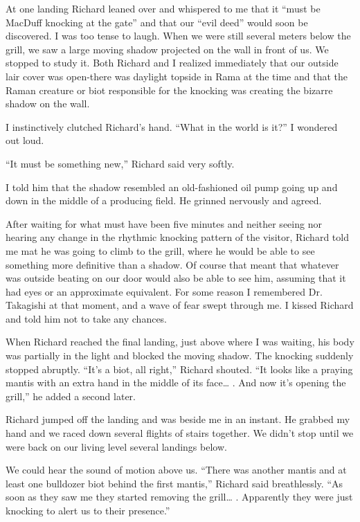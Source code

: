 \documentclass[]{article}
\begin{document}
At one landing Richard leaned over and whispered to me that it “must be MacDuff knocking at the gate” and that our “evil deed” would soon be discovered. I was too tense to laugh. When we were still several meters below the grill, we saw a large moving shadow projected on the wall in front of us. We stopped to study it. Both Richard and I realized immediately that our outside lair cover was open-there was daylight topside in Rama at the time and that the Raman creature or biot responsible for the knocking was creating the bizarre shadow on the wall.

I instinctively clutched Richard’s hand. “What in the world is it?” I wondered out loud.

“It must be something new,” Richard said very softly.

I told him that the shadow resembled an old-fashioned oil pump going up and down in the middle of a producing field. He grinned nervously and agreed.

After waiting for what must have been five minutes and neither seeing nor hearing any change in the rhythmic knocking pattern of the visitor, Richard told me mat he was going to climb to the grill, where he would be able to see something more definitive than a shadow. Of course that meant that whatever was outside beating on our door would also be able to see him, assuming that it had eyes or an approximate equivalent. For some reason I remembered Dr. Takagishi at that moment, and a wave of fear swept through me. I kissed Richard and told him not to take any chances.

When Richard reached the final landing, just above where I was waiting, his body was partially in the light and blocked the moving shadow. The knocking suddenly stopped abruptly. “It’s a biot, all right,” Richard shouted. “It looks like a praying mantis with an extra hand in the middle of its face… . And now it’s opening the grill,” he added a second later.

Richard jumped off the landing and was beside me in an instant. He grabbed my hand and we raced down several flights of stairs together. We didn’t stop until we were back on our living level several landings below.

We could hear the sound of motion above us. “There was another mantis and at least one bulldozer biot behind the first mantis,” Richard said breathlessly. “As soon as they saw me they started removing the grill… . Apparently they were just knocking to alert us to their presence.”
\end{document}
